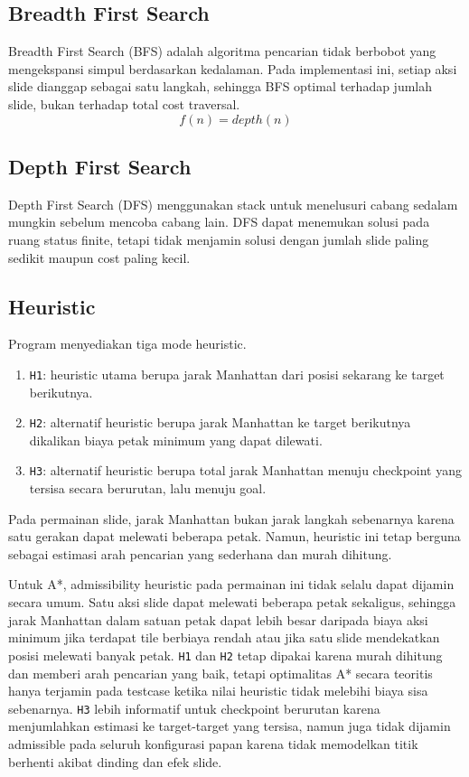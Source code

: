 \subsection{Breadth First Search}\label{sub:BFS}

Breadth First Search (BFS) adalah algoritma pencarian tidak berbobot
yang mengekspansi simpul berdasarkan kedalaman. Pada implementasi ini,
setiap aksi slide dianggap sebagai satu langkah, sehingga BFS optimal
terhadap jumlah slide, bukan terhadap total cost traversal.
\[
    f(n) = depth(n)
\]

\subsection{Depth First Search}\label{sub:DFS}

Depth First Search (DFS) menggunakan stack untuk menelusuri cabang
sedalam mungkin sebelum mencoba cabang lain. DFS dapat menemukan
solusi pada ruang status finite, tetapi tidak menjamin solusi dengan
jumlah slide paling sedikit maupun cost paling kecil.

\subsection{Heuristic}\label{sub:Heuristic}

Program menyediakan tiga mode heuristic.
\begin{enumerate}
    \item \texttt{H1}: heuristic utama berupa jarak Manhattan dari
        posisi sekarang ke target berikutnya.
    \item \texttt{H2}: alternatif heuristic berupa jarak Manhattan ke
        target berikutnya dikalikan biaya petak minimum yang dapat dilewati.
    \item \texttt{H3}: alternatif heuristic berupa total jarak
        Manhattan menuju checkpoint yang
        tersisa secara berurutan, lalu menuju goal.
\end{enumerate}

Pada permainan slide, jarak Manhattan bukan jarak langkah sebenarnya
karena satu gerakan dapat melewati beberapa petak. Namun, heuristic
ini tetap berguna sebagai estimasi arah pencarian yang sederhana dan
murah dihitung.

Untuk A*, admissibility heuristic pada permainan ini tidak selalu
dapat dijamin secara umum. Satu aksi slide dapat melewati beberapa
petak sekaligus, sehingga jarak Manhattan dalam satuan petak dapat
lebih besar daripada biaya aksi minimum jika terdapat tile berbiaya
rendah atau jika satu slide mendekatkan posisi melewati banyak petak.
\texttt{H1} dan \texttt{H2} tetap dipakai karena murah dihitung dan
memberi arah pencarian yang baik, tetapi optimalitas A* secara teoritis
hanya terjamin pada testcase ketika nilai heuristic tidak melebihi
biaya sisa sebenarnya. \texttt{H3} lebih informatif untuk checkpoint
berurutan karena menjumlahkan estimasi ke target-target yang tersisa,
namun juga tidak dijamin admissible pada seluruh konfigurasi papan
karena tidak memodelkan titik berhenti akibat dinding dan efek slide.
